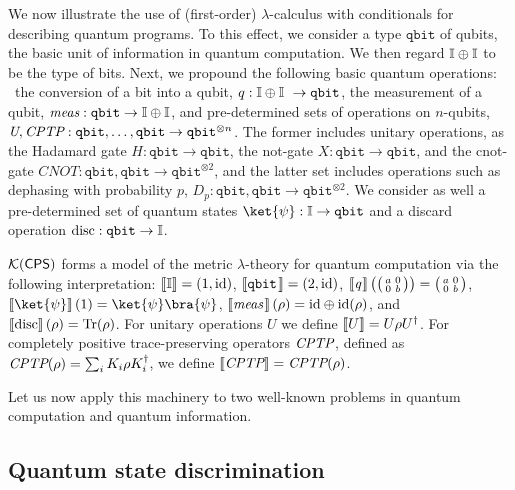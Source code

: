 We now illustrate the use of (first-order) $\lambda$-calculus with conditionals for describing quantum
programs. To this effect, we consider a type $\mathtt{qbit}$ of qubits, the
basic unit of information in quantum computation. We then regard $\mathbb{I} \oplus
\mathbb{I}$ to be the type of bits. Next, we propound the following
basic quantum operations:  the conversion of a bit into a qubit, $q : \typeI
\oplus \typeI  \to \mathtt{qbit}$, the measurement of a qubit,
$\emph{meas}:\mathtt{qbit} \to \mathbb{I} \oplus \mathbb{I}$, and pre-determined sets of
operations on $n$-qubits, $\emph{U},\emph{CPTP}:\mathtt{qbit},\ldots,\mathtt{qbit} \to
\mathtt{qbit}^{\otimes n}$. The former includes unitary operations, as the Hadamard
gate $H : \mathtt{qbit} \to \mathtt{qbit}$, the not-gate $X : \mathtt{qbit} \to
\mathtt{qbit}$, and the cnot-gate $CNOT : \mathtt{qbit},\mathtt{qbit} \to
\mathtt{qbit}^{\otimes 2}$, and the latter set includes operations such as dephasing with probability $p$, $D_p : \mathtt{qbit},\mathtt{qbit} \to
\mathtt{qbit}^{\otimes 2}$. We consider as well a pre-determined set of quantum
states $\ket{\psi} : \typeI \to \mathtt{qbit}$ and a discard operation $\text{disc}: \mathtt{qbit} \to \mathbb{I}$.  

$\mathcal{K}{(\mathsf{CPS})}$ forms a model of the metric $\lambda$-theory for quantum computation via the following interpretation: $\left \llbracket \mathbb{I} \right \rrbracket= \left( 1, \mathrm{id}\right)$, 
$\left \llbracket \mathtt{qbit} \hspace{1pt} \right \rrbracket= \left(2, \mathrm{id}\right)$, 
$\left \llbracket \emph{q} \hspace{1pt} \right \rrbracket\left(\big(\begin{smallmatrix}
  a & 0\\
  0 & b
\end{smallmatrix}\big)\right) = \big(\begin{smallmatrix}
  a & 0\\
  0 & b
\end{smallmatrix}\big)$, 
 $\sem{\ket{\psi}} (1)= \ket{\psi} \bra{\psi}$,
$\left \llbracket \emph{meas} \hspace{1pt} \right \rrbracket (\rho)= \mathrm{id} \oplus \mathrm{id} (\rho)$, and $\left \llbracket \text{disc} \right \rrbracket (\rho)= \text{Tr} (\rho)$.
For unitary operations $U$ we define $\left \llbracket U \right \rrbracket= U \rho U^{\dag}$.
For completely positive trace-preserving operators $\emph{CPTP}$, defined as $\emph{CPTP} (\rho) = \sum_i K_i \rho K_i^{\dag}$, we define  $\left \llbracket \emph{CPTP} \right \rrbracket = \emph{CPTP}(\rho)$.

Let us now apply this machinery to two well-known problems in quantum computation
and quantum information.

\subsection{Quantum state discrimination}


